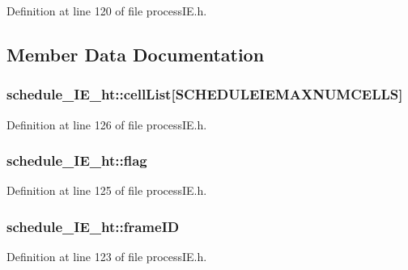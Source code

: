 Definition at line 120 of file process\+I\+E.\+h.



\subsection{Member Data Documentation}
\subsubsection[{\texorpdfstring{cell\+List}{cellList}}]{ schedule\+\_\+\+I\+E\+\_\+ht\+::cell\+List\mbox{[}{\bf S\+C\+H\+E\+D\+U\+L\+E\+I\+E\+M\+A\+X\+N\+U\+M\+C\+E\+L\+LS}\mbox{]}}\hypertarget{structschedule___i_e__ht_add67be7b2b97529b8ac1c377b29b761b}{}\label{structschedule___i_e__ht_add67be7b2b97529b8ac1c377b29b761b}


Definition at line 126 of file process\+I\+E.\+h.

\subsubsection[{\texorpdfstring{flag}{flag}}]{ schedule\+\_\+\+I\+E\+\_\+ht\+::flag}\hypertarget{structschedule___i_e__ht_a5acbeb55ef84420e4d808f378ac30d39}{}\label{structschedule___i_e__ht_a5acbeb55ef84420e4d808f378ac30d39}


Definition at line 125 of file process\+I\+E.\+h.

\subsubsection[{\texorpdfstring{frame\+ID}{frameID}}]{ schedule\+\_\+\+I\+E\+\_\+ht\+::frame\+ID}\hypertarget{structschedule___i_e__ht_a0eb064215038e5c6af6cf9663ffea2d3}{}\label{structschedule___i_e__ht_a0eb064215038e5c6af6cf9663ffea2d3}


Definition at line 123 of file process\+I\+E.\+h.

